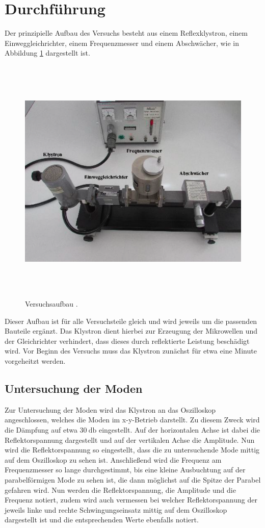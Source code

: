 \section{Durchführung}
\label{sec:Durchführung}
Der prinzipielle Aufbau des Versuchs besteht aus einem Reflexklystron, einem
Einweggleichrichter, einem Frequenzmesser und einem Abschwächer, wie in Abbildung
\ref{fig:aufbau} dargestellt ist.
\begin{figure}[H]
  \centering
  \includegraphics[height=12cm]{aufbau.png}
  \caption{Versuchsaufbau \cite{Skript}.}
  \label{fig:aufbau}
\end{figure}
Dieser Aufbau ist für alle Versuchsteile gleich und wird jeweils um die passenden
Bauteile ergänzt. Das Klystron dient hierbei zur Erzeugung der Mikrowellen und der
Gleichrichter verhindert, dass dieses durch reflektierte Leistung beschädigt wird.
Vor Beginn des Versuchs muss das Klystron zunächst für etwa eine Minute vorgeheitzt
werden.

\subsection{Untersuchung der Moden}
Zur Untersuchung der Moden wird das Klystron an das Oszilloskop angeschlossen, welches
die Moden im x-y-Betrieb darstellt. Zu diesem Zweck wird die Dämpfung auf etwa
$\SI{30}{\decibel}$ eingestellt. Auf der horizontalen Achse ist dabei die Reflektorspannung
dargestellt und auf der vertikalen Achse die Amplitude. Nun wird die Reflektorspannung
so eingestellt, dass die zu untersuchende Mode mittig auf dem Oszilloskop zu sehen ist.
Anschließend wird die Frequenz am Frequenzmesser so lange durchgestimmt, bis eine kleine
Ausbuchtung auf der parabelförmigen Mode zu sehen ist, die dann möglichst auf die
Spitze der Parabel gefahren wird. Nun werden die Reflektorspannung, die Amplitude und
die Frequenz notiert, zudem wird auch vermessen bei welcher Reflektorspannung der jeweils
linke und rechte Schwingungseinsatz mittig auf dem Oszilloskop dargestellt ist und die
entsprechenden Werte ebenfalls notiert. \\

